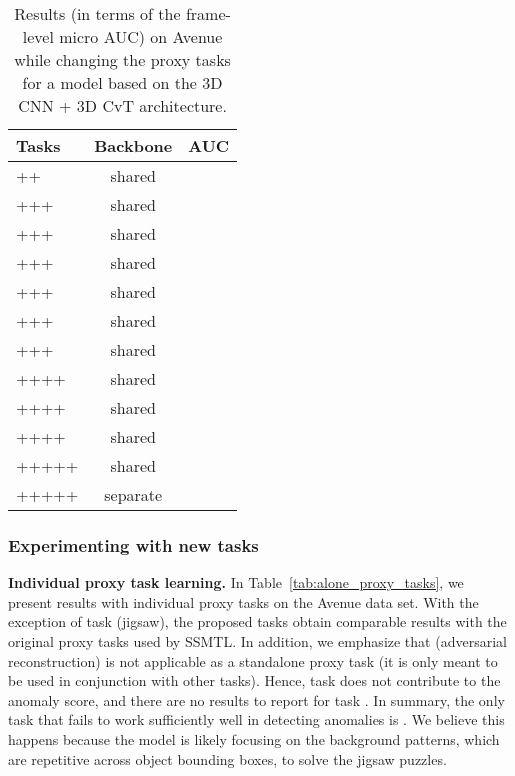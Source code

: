 \documentclass[times,twocolumn,final,authoryear]{elsarticle}
\begin{document}
\begin{table}[t]
\caption{Results (in terms of the frame-level micro AUC) on Avenue while changing the proxy tasks for a model based on the 3D CNN + 3D CvT architecture.}\label{tab:proxy_tasks}
\begin{center}
\begin{tabular}{|l|c|c|}
\hline
{Tasks}                                 & Backbone  & {AUC} \\
\hline\hline
++                       & shared    &  \\
+++                 & shared    &  \\
+++                 & shared    &  \\
+++                 & shared    &  \\
+++                 & shared    &  \\
+++                 & shared    &  \\
+++                 & shared    &  \\
++++           & shared    &  \\
++++           & shared    &  \\
++++           & shared    &  \\
+++++     & shared    &  \\
+++++     & separate   &  \\
\hline
\end{tabular}
\end{center}
\end{table}

\subsubsection{Experimenting with new tasks}

\noindent
{\bf Individual proxy task learning.}
In Table~\ref{tab:alone_proxy_tasks}, we present results with individual proxy tasks on the Avenue data set. With the exception of task  (jigsaw), the proposed tasks obtain comparable results with the original proxy tasks used by SSMTL. In addition, we emphasize that  (adversarial reconstruction) is not applicable as a standalone proxy task (it is only meant to be used in conjunction with other tasks). Hence, task  does not contribute to the anomaly score, and there are no results to report for task . In summary, the only task that fails to work sufficiently well in detecting anomalies is . We believe this happens because the model is likely focusing on the background patterns, which are repetitive across object bounding boxes, to solve the jigsaw puzzles.
\end{document}

